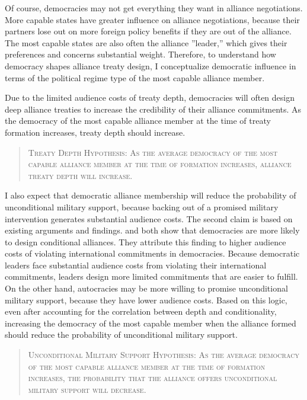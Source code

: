 \documentclass[12pt]{article}
\begin{document}
Of course, democracies may not get everything they want in alliance negotiations. 
More capable states have greater influence on alliance negotiations, because their partners lose out on more foreign policy benefits if they are out of the alliance.
The most capable states are also often the alliance ''leader,'' which gives their preferences and concerns substantial weight. 
Therefore, to understand how democracy shapes alliance treaty design, I conceptualize democratic influence in terms of the political regime type of the most capable alliance member. 

Due to the limited audience costs of treaty depth, democracies will often design deep alliance treaties to increase the credibility of their alliance commitments. 
As the democracy of the most capable alliance member at the time of treaty formation increases, treaty depth should increase. 


\begin{quote}
\textsc{Treaty Depth Hypothesis: As the average democracy of the most capable alliance member at the time of formation increases, alliance treaty depth will increase.}
\end{quote} 


I also expect that democratic alliance membership will reduce the probability of unconditional military support, because backing out of a promised military intervention generates substantial audience costs. 
The second claim is based on existing arguments and findings. 
\citet{Mattes2012} and \citet{Chibaetal2015} both show that democracies are more likely to design conditional alliances. 
They attribute this finding to higher audience costs of violating international commitments in democracies. 
Because democratic leaders face substantial audience costs from violating their international commitments, leaders design more limited commitments that are easier to fulfill. 
On the other hand, autocracies may be more willing to promise unconditional military support, because they have lower audience costs. 
Based on this logic, even after accounting for the correlation between depth and conditionality, increasing the democracy of the most capable member when the alliance formed should reduce the probability of unconditional military support.


\begin{quote}
\textsc{Unconditional Military Support Hypothesis: As the average democracy of the most capable alliance member at the time of formation increases, the probability that the alliance offers unconditional military support will decrease.}
\end{quote} 
\end{document}
